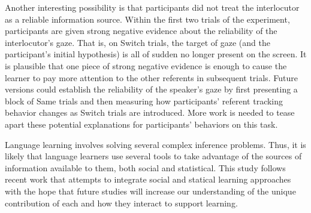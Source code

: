 \documentclass[10pt,letterpaper]{article}
\begin{document}
Another interesting possibility is that participants did not treat the interlocutor as a reliable information source. Within the first two trials of the experiment, participants are given strong negative evidence about the reliability of the interlocutor's gaze. That is, on Switch trials, the target of gaze (and the participant's initial hypothesis) is all of sudden no longer present on the screen. It is plausible that one piece of strong negative evidence is enough to cause the learner to pay more attention to the other referents in subsequent trials. Future versions could establish the reliability of the speaker's gaze by first presenting a block of Same trials and then measuring how participants' referent tracking behavior changes as Switch trials are introduced. More work is needed to tease apart these potential explanations for participants' behaviors on this task.

Language learning involves solving several complex inference problems. Thus, it is likely that language learners use several tools to take advantage of the sources of information available to them, both social and statistical. This study follows recent work that attempts to integrate social and statical learning approaches with the hope that future studies will increase our understanding of the unique contribution of each and how they interact to support learning. 



\setlength{\bibleftmargin}{.125in}
\setlength{\bibindent}{-\bibleftmargin}


\end{document}
